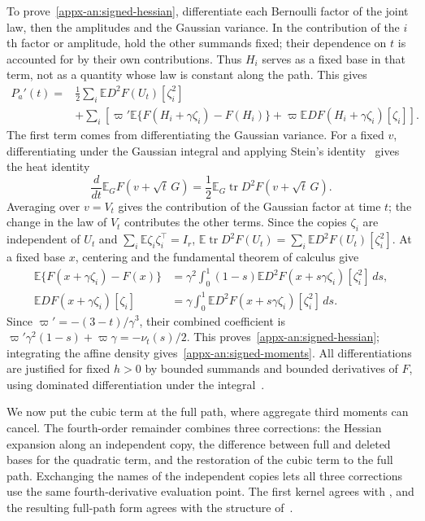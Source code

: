 \documentclass[11pt,letterpaper]{article}
\theoremstyle{remark}
\newcommand{\E}{\mathbb E}
\newcommand{\tr}{\operatorname{tr}}
\newcommand{\dd}{\,d}
\begin{document}
To prove~\eqref{appx-an:signed-hessian}, differentiate each Bernoulli
factor of the joint law, then the amplitudes and the Gaussian variance.
In the contribution of the \(i\)th factor or amplitude, hold the other
summands fixed; their dependence on \(t\) is accounted for by their
own contributions. Thus \(H_i\) serves as a fixed base in that term,
not as a quantity whose law is constant along the path. This gives
\begin{align*}
 P_a'(t)
 ={}&\frac12\sum_i\E D^2F(U_t)[\zeta_i^2]\\
 &+\sum_i\left[\varpi'\E\{F(H_i+\gamma\zeta_i)-F(H_i)\}
             +\varpi\E DF(H_i+\gamma\zeta_i)[\zeta_i]\right].
\end{align*}
The first term comes from differentiating the Gaussian variance.
For a fixed \(v\), differentiating under the Gaussian integral and
applying Stein's identity~\cite{Stein1981} gives the heat identity
\[
 \frac{d}{dt}\E_G F(v+\sqrt t\,G)
 =\frac12\E_G\tr D^2F(v+\sqrt t\,G).
\]
Averaging over \(v=V_t\) gives the contribution of the Gaussian
factor at time \(t\); the change in the law of \(V_t\) contributes
the other terms. Since the copies \(\zeta_i\) are independent of
\(U_t\) and \(\sum_i\E\zeta_i\zeta_i^\top=I_r\),
\(\E\tr D^2F(U_t)=\sum_i\E D^2F(U_t)[\zeta_i^2]\).
At a fixed base \(x\), centering and the fundamental theorem of calculus give
\begin{align*}
 \E\{F(x+\gamma\zeta_i)-F(x)\}
 &=\gamma^2\int_0^1(1-s)
       \E D^2F(x+s\gamma\zeta_i)[\zeta_i^2]\dd s,\\
 \E DF(x+\gamma\zeta_i)[\zeta_i]
 &=\gamma\int_0^1\E D^2F(x+s\gamma\zeta_i)[\zeta_i^2]\dd s.
\end{align*}
Since \(\varpi'=-(3-t)/\gamma^3\), their combined coefficient
is \(\varpi'\gamma^2(1-s)+\varpi\gamma=-\nu_t(s)/2\).
This proves~\eqref{appx-an:signed-hessian}; integrating the affine
density gives~\eqref{appx-an:signed-moments}. All differentiations
are justified for fixed \(h>0\) by bounded summands and bounded
derivatives of \(F\), using dominated differentiation under the
integral~\cite[Section~2.3]{Folland1999}.

We now put the cubic term at the full path, where aggregate third
moments can cancel. The fourth-order remainder combines three
corrections: the Hessian expansion along an independent copy, the
difference between full and deleted bases for the quadratic term, and
the restoration of the cubic term to the full path. Exchanging the
names of the independent copies lets all three corrections use the
same fourth-derivative evaluation point. The first kernel agrees with
\cite[Lemma~4.1]{AL}, and the resulting full-path form agrees with
the structure of~\cite[Lemma~22]{GaoZhang}.
\end{document}
